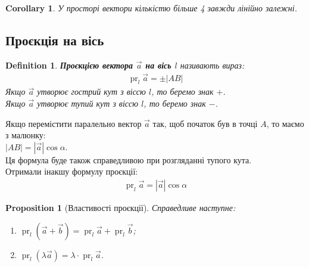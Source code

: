 \documentclass[a4paper, 10pt]{extarticle}
\theoremstyle{theoremdd}
\theoremstyle{theoremdd}
\newtheorem{definition}[theorem]{Definition}
\theoremstyle{theoremdd}
\theoremstyle{theoremdd}
\theoremstyle{theoremdd}
\newtheorem{proposition}[theorem]{Proposition}
\theoremstyle{theoremdd}
\theoremstyle{theoremdd}
\theoremstyle{theoremdd}
\newtheorem{corollary}[theorem]{Corollary}
\DeclareMathOperator{\pr}{pr}
\begin{document}
\begin{corollary}
	У просторі вектори кількістю більше 4 завжди лінійно залежні.
\end{corollary}
	
\subsection{Проєкція на вісь}
\begin{definition}
	\textbf{Проєкцією вектора $\vec{a}$ на вісь $l$} називають вираз:
	\begin{align*}
	\pr_l \vec{a} = \pm |AB|
	\end{align*}
	Якщо $\vec{a}$ утворює гострий кут з віссю $l$, то беремо знак $+$.\\
	Якщо $\vec{a}$ утворює тупий кут з віссю $l$, то беремо знак $-$.
\begin{figure}[H]
\centering
\end{figure}
\end{definition}

	Якщо перемістити паралельно вектор $\vec{a}$ так, щоб початок був в точці $A$, то маємо з малюнку:\\
	$|AB| = |\vec{a}| \cos \alpha$.\\
	Ця формула буде також справедливою при розгляданні тупого кута.\\
	Отримали інакшу формулу проєкції:
	\begin{align*}
	\pr_l \vec{a} = |\vec{a}| \cos \alpha
	\end{align*}
	
\begin{proposition}[Властивості проєкції]
Справедливе наступне:
\begin{enumerate}[nosep,wide=0pt,label={\arabic*)}]
	\item $\pr_l (\vec{a} + \vec{b}) = \pr_l \vec{a} + \pr_l \vec{b}$;
	\item $\pr_l (\lambda \vec{a}) = \lambda \cdot \pr_l \vec{a}$.
\end{enumerate}
\end{proposition}
\end{document}
